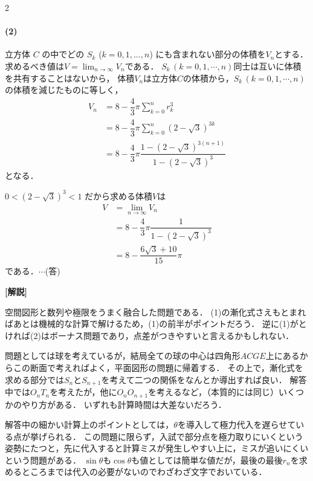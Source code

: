 \documentclass[../../main.tex]{subfiles}
\begin{document}
\begin{multicols}{2}
  \paragraph{(2)}
  立方体 $C$ の中でどの $S_k$ ($k=0,1,\ldots, n$) にも含まれない部分の体積を$V_n$とする．
  求めるべき値は$\displaystyle V = \lim_{n\to\infty}V_n$である．
  $S_k\, (k=0,1,\cdots,n)$同士は互いに体積を共有することはないから，
  体積$V_n$は立方体$C$の体積から，$S_k\, (k=0,1,\cdots,n)$の体積を減じたものに等しく，
  \begin{align}
    V_n & = 8 - \dfrac{4}{3}\pi \sum_{k=0}^{n} r_k^3                             \\
    & = 8 - \dfrac{4}{3}\pi \sum_{k=0}^{n} (2-\sqrt{3})^{3k}                 \\
    & = 8 - \dfrac{4}{3}\pi \dfrac{1-(2-\sqrt{3})^{3(n+1)}}{1-(2-\sqrt{3})^3}
  \end{align}
  となる．

  $0<(2-\sqrt{3})^3 < 1$ だから求める体積$V$は
  \begin{align}
    V & = \lim_{n \to \infty} V_n                       \\
    & = 8 - \dfrac{4}{3}\pi \dfrac{1}{1-(2-\sqrt{3})^3} \\
    & = 8 - \dfrac{6\sqrt{3}+10}{15}\pi
  \end{align}
  である．$\cdots$(答)

  {\bf [解説]}

  空間図形と数列や極限をうまく融合した問題である．
  (1)の漸化式さえもとまればあとは機械的な計算で解けるため，(1)の前半がポイントだろう．
  逆に(1)がとければ(2)はボーナス問題であり，点差がつきやすいと言えるかもしれない．

  問題としては球を考えているが，結局全ての球の中心は四角形$ACGE$上にあるからこの断面で考えればよく，平面図形の問題に帰着する．
  その上で，漸化式を求める部分では$S_n$と$S_{n+1}$を考えて二つの関係をなんとか導出すれば良い．
  解答中では$O_nT_n$を考えたが，他に$O_nO_{n+1}$を考えるなど，（本質的には同じ）いくつかのやり方がある．
  いずれも計算時間は大差ないだろう．

  解答中の細かい計算上のポイントとしては，$\theta$を導入して極力代入を遅らせている点が挙げられる．
  この問題に限らず，入試で部分点を極力取りにいくという姿勢にたつと，先に代入すると計算ミスが発生しやすい上に，ミスが追いにくいという問題がある．
  $\sin\theta$も$\cos\theta$も値としては簡単な値だが，最後の最後$r_n$を求めるところまでは代入の必要がないのでわざわざ文字でおいている．

  \newpage
\end{multicols}
\end{document}
